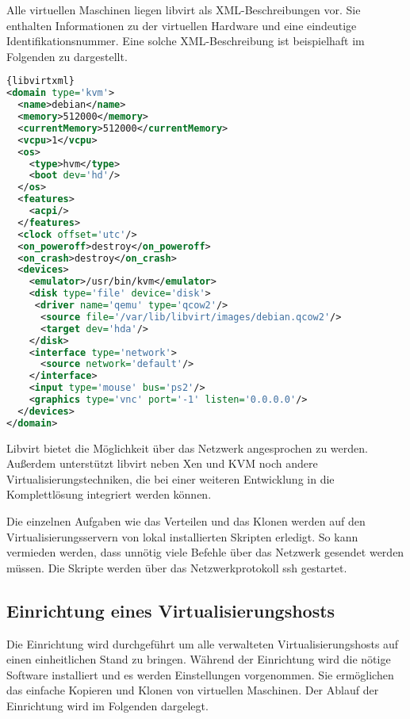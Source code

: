 Alle virtuellen Maschinen liegen libvirt als XML-Beschreibungen vor. Sie enthalten Informationen zu der virtuellen Hardware und eine eindeutige Identifikationsnummer. Eine solche XML-Beschreibung ist beispielhaft im Folgenden zu dargestellt.
\\
\begin{lstlisting}[caption=libvirt-XML Beispiel,language=XML,label=libvirtxml]{libvirtxml}
<domain type='kvm'>
  <name>debian</name>
  <memory>512000</memory>
  <currentMemory>512000</currentMemory>
  <vcpu>1</vcpu>
  <os>
    <type>hvm</type>
    <boot dev='hd'/>
  </os>
  <features>
    <acpi/>
  </features>
  <clock offset='utc'/>
  <on_poweroff>destroy</on_poweroff>
  <on_crash>destroy</on_crash>
  <devices>
    <emulator>/usr/bin/kvm</emulator>
    <disk type='file' device='disk'>
     <driver name='qemu' type='qcow2'/>
      <source file='/var/lib/libvirt/images/debian.qcow2'/>
      <target dev='hda'/>
    </disk>
    <interface type='network'>
      <source network='default'/>
    </interface>
    <input type='mouse' bus='ps2'/>
    <graphics type='vnc' port='-1' listen='0.0.0.0'/>
  </devices>
</domain>
\end{lstlisting}

Libvirt bietet die Möglichkeit über das Netzwerk angesprochen zu werden. Außerdem unterstützt libvirt neben Xen und KVM noch andere Virtualisierungstechniken, die bei einer weiteren Entwicklung in die Komplettlösung integriert werden können.%

Die einzelnen Aufgaben wie das Verteilen und das Klonen werden auf den Virtualisierungsservern von lokal installierten Skripten erledigt. So kann vermieden werden, dass unnötig viele Befehle über das Netzwerk gesendet werden müssen. Die Skripte werden über das Netzwerkprotokoll ssh gestartet.


\subsection{Einrichtung eines Virtualisierungshosts}\label{einrichtung}
Die Einrichtung wird durchgeführt um alle verwalteten Virtualisierungshosts auf einen einheitlichen Stand zu bringen. Während der Einrichtung wird die nötige Software installiert und es werden Einstellungen vorgenommen. Sie ermöglichen das einfache Kopieren und Klonen von virtuellen Maschinen. Der Ablauf der Einrichtung wird im Folgenden dargelegt. 

